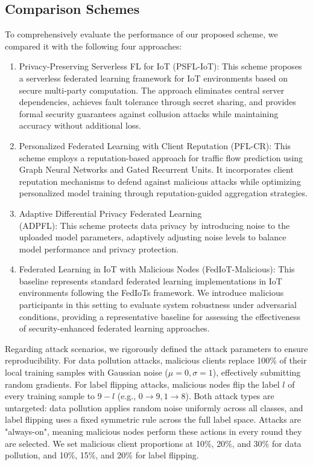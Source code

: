 \documentclass[a4paper]{cas-dc}
\begin{document}
\subsection{Comparison Schemes}
To comprehensively evaluate the performance of our proposed scheme, we compared it with the following four approaches:
\begin{enumerate}[1)]
	\item Privacy-Preserving Serverless FL for IoT (PSFL-IoT)\cite{65}: This scheme proposes a serverless federated learning framework for IoT environments based on secure multi-party computation. The approach eliminates central server dependencies, achieves fault tolerance through secret sharing, and provides formal security guarantees against collusion attacks while maintaining accuracy without additional loss.
	
	\item Personalized Federated Learning with Client Reputation (PFL-CR)\cite{64}: This scheme employs a reputation-based approach for traffic flow prediction using Graph Neural Networks and Gated Recurrent Units. It incorporates client reputation mechanisms to defend against malicious attacks while optimizing personalized model training through reputation-guided aggregation strategies.
	
	\item Adaptive Differential Privacy Federated Learning \\(ADPFL)\cite{12}: This scheme protects data privacy by introducing noise to the uploaded model parameters, adaptively adjusting noise levels to balance model performance and privacy protection.
	
	\item Federated Learning in IoT with Malicious Nodes (FedIoT-Malicious): This baseline represents standard federated learning implementations in IoT environments following the FedIoTs framework\cite{65}. We introduce malicious participants in this setting to evaluate system robustness under adversarial conditions, providing a representative baseline for assessing the effectiveness of security-enhanced federated learning approaches.
\end{enumerate}

Regarding attack scenarios, we rigorously defined the attack parameters to ensure reproducibility. For data pollution attacks, malicious clients replace 100\% of their local training samples with Gaussian noise ($\mu=0, \sigma=1$), effectively submitting random gradients. For label flipping attacks, malicious nodes flip the label $l$ of every training sample to $9-l$ (e.g., $0 \to 9, 1 \to 8$). Both attack types are untargeted: data pollution applies random noise uniformly across all classes, and label flipping uses a fixed symmetric rule across the full label space. Attacks are "always-on", meaning malicious nodes perform these actions in every round they are selected. We set malicious client proportions at 10\%, 20\%, and 30\% for data pollution, and 10\%, 15\%, and 20\% for label flipping.
\end{document}
